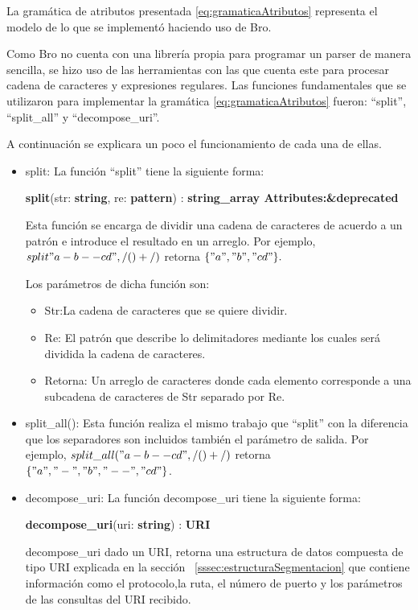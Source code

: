     La gramática de atributos presentada \ref{eq:gramaticaAtributos} representa el modelo de lo que se implementó haciendo uso de Bro.

    Como Bro no cuenta con una librería propia para programar un parser de manera sencilla, se hizo uso de las herramientas con las que cuenta este para procesar cadena de caracteres y expresiones regulares. Las funciones fundamentales que se utilizaron para implementar  la gramática \ref{eq:gramaticaAtributos} fueron: ``split'', ``split\_all'' y ``decompose\_uri''.

A continuación se explicara un poco el funcionamiento de cada una de ellas.

\begin{itemize}
\item split:
La función ``split'' tiene la siguiente forma:

\textbf{split}(str: \textbf{string}, re: \textbf{pattern}) : \textbf{string\_array Attributes:\&deprecated}

Esta función se encarga de dividir una cadena de caracteres de acuerdo a un patrón e introduce el resultado en un arreglo. Por ejemplo, $split"a-b--cd", /(\-)+/)$ retorna $\{"a", "b", "cd"\}.$

Los parámetros de dicha función son:

\begin{itemize}
\item Str:La cadena de caracteres que se quiere dividir. 
\item Re: El patrón que describe lo delimitadores mediante los cuales será dividida la cadena de caracteres. 
\item Retorna: Un arreglo de caracteres donde cada elemento corresponde a una subcadena de caracteres de Str separado por Re.
\end{itemize}

\item split\_all():
Esta función realiza el mismo trabajo que ``split'' con la diferencia que los separadores son incluidos también el parámetro de salida.  Por ejemplo, $split\_all("a-b--cd", /(\-)+/)$ retorna $\{"a", "-", "b", "--", "cd"\}$.

\item decompose\_uri:
La función decompose\_uri tiene la siguiente forma:

\textbf{decompose\_uri}(uri: \textbf{string}) : \textbf{URI}

decompose\_uri dado un URI, retorna una estructura de datos compuesta de tipo URI explicada en la sección ~\ref{sssec:estructuraSegmentacion} que contiene información como el protocolo,la ruta, el número de puerto y los parámetros de las consultas del URI recibido.
\end{itemize}

